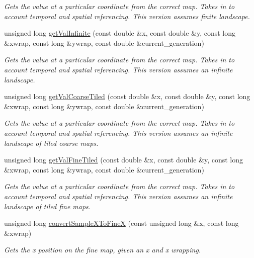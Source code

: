 \begin{DoxyCompactItemize}
\begin{DoxyCompactList}\small\item\em Gets the value at a particular coordinate from the correct map. Takes in to account temporal and spatial referencing. This version assumes finite landscape. \end{DoxyCompactList}\item 
unsigned long \hyperlink{class_map_a89d1a01f4e88146dd6860f7d3c71a43b}{get\+Val\+Infinite} (const double \&x, const double \&y, const long \&xwrap, const long \&ywrap, const double \&current\+\_\+generation)
\begin{DoxyCompactList}\small\item\em Gets the value at a particular coordinate from the correct map. Takes in to account temporal and spatial referencing. This version assumes an infinite landscape. \end{DoxyCompactList}\item 
unsigned long \hyperlink{class_map_a40ddaa602e7b0e65995638025234de64}{get\+Val\+Coarse\+Tiled} (const double \&x, const double \&y, const long \&xwrap, const long \&ywrap, const double \&current\+\_\+generation)
\begin{DoxyCompactList}\small\item\em Gets the value at a particular coordinate from the correct map. Takes in to account temporal and spatial referencing. This version assumes an infinite landscape of tiled coarse maps. \end{DoxyCompactList}\item 
unsigned long \hyperlink{class_map_ac9af706dce7adc8d8db17a6189abd1bd}{get\+Val\+Fine\+Tiled} (const double \&x, const double \&y, const long \&xwrap, const long \&ywrap, const double \&current\+\_\+generation)
\begin{DoxyCompactList}\small\item\em Gets the value at a particular coordinate from the correct map. Takes in to account temporal and spatial referencing. This version assumes an infinite landscape of tiled fine maps. \end{DoxyCompactList}\item 
unsigned long \hyperlink{class_map_a12d17532ea880afc77b729f1005b6e4f}{convert\+Sample\+X\+To\+FineX} (const unsigned long \&x, const long \&xwrap)
\begin{DoxyCompactList}\small\item\em Gets the x position on the fine map, given an x and x wrapping. \end{DoxyCompactList}\item 

\end{DoxyCompactItemize}
